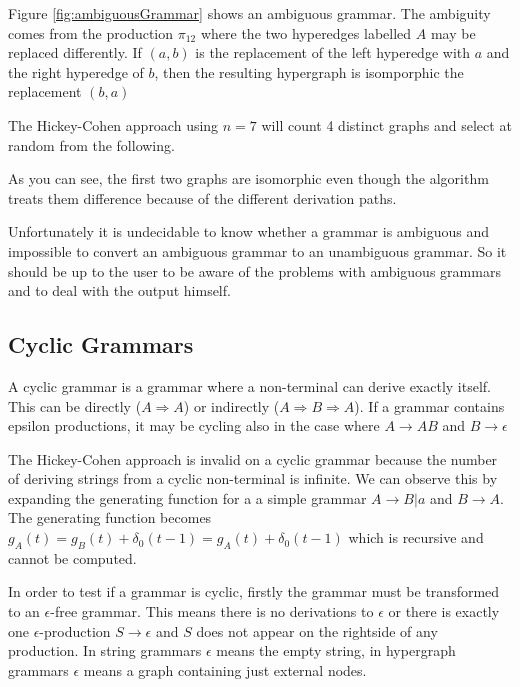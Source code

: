 

Figure \ref{fig:ambiguousGrammar} shows an ambiguous grammar. The ambiguity comes from the production $\pi_{12}$ where the two hyperedges labelled $A$ may be replaced differently. If $(a,b)$ is the replacement of the left hyperedge with $a$ and the right hyperedge of $b$, then the resulting hypergraph is isomporphic the replacement $(b, a)$

The Hickey-Cohen approach using $n=7$ will count 4 distinct graphs and select at random from the following.



As you can see, the first two graphs are isomorphic even though the algorithm treats them difference because of the different derivation paths.

Unfortunately it is undecidable to know whether a grammar is ambiguous and impossible to convert an ambiguous grammar to an unambiguous grammar. So it should be up to the user to be aware of the problems with ambiguous grammars and to deal with the output himself.

\subsection{Cyclic Grammars}

A cyclic grammar is a grammar where a non-terminal can derive exactly itself. This can be directly ($A \Rightarrow A$) or indirectly ($A \Rightarrow B \Rightarrow A$). If a grammar contains epsilon productions, it may be cycling also in the case where $A \to AB$ and $B \to \epsilon$

The Hickey-Cohen approach is invalid on a cyclic grammar because the number of deriving strings from a cyclic non-terminal is infinite. We can observe this by expanding the generating function for a a simple grammar $A \to B | a$ and $B \to A$. The generating function becomes $g_A(t) = g_B(t) + \delta_0(t-1) = g_A(t) + \delta_0(t-1)$ which is recursive and cannot be computed.

In order to test if a grammar is cyclic, firstly the grammar must be transformed to an $\epsilon$-free grammar. This means there is no derivations to $\epsilon$ or there is exactly one $\epsilon$-production $S \to \epsilon$ and $S$ does not appear on the rightside of any production. In string grammars $\epsilon$ means the empty string, in hypergraph grammars $\epsilon$ means a graph containing just external nodes.

